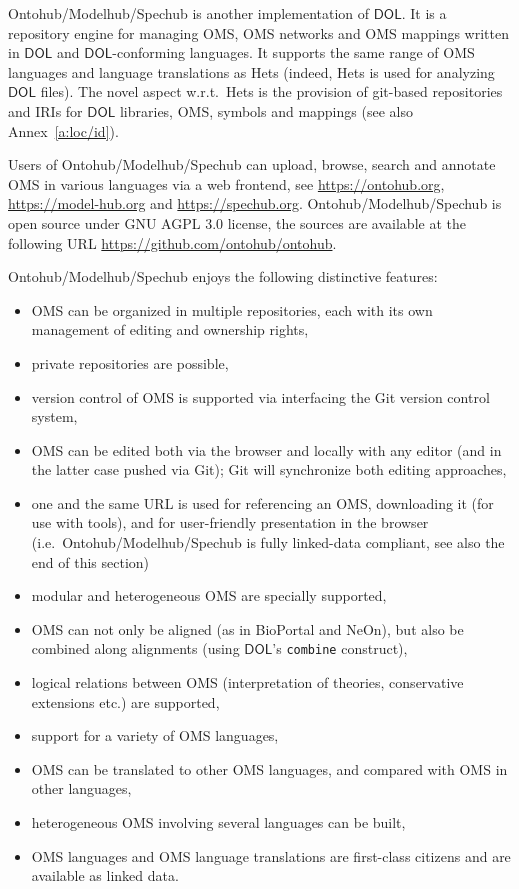 \documentclass[10pt, a4paper]{isov2}
\newcommand*{\syntax}[1]{\texttt{#1}}
\newcommand*{\DOL}{\ensuremath{\mathsf{DOL}}\xspace}
\begin{document}
\label{a:ontohub}


Ontohub/Modelhub/Spechub is  another implementation  of
\DOL. It is a repository engine for managing OMS, OMS networks and OMS
mappings written in \DOL and \DOL-conforming languages.  It supports the
same range of OMS languages and language translations as Hets (indeed,
Hets is used for analyzing \DOL files). The novel aspect w.r.t.\ Hets
is the provision of git-based repositories and IRIs for \DOL libraries,
OMS, symbols and mappings (see also Annex~\ref{a:loc/id}).

Users of Ontohub/Modelhub/Spechub can upload, browse, search and annotate 
OMS in various languages via a web frontend, 
see \url{https://ontohub.org}, \url{https://model-hub.org} and \url{https://spechub.org}.
Ontohub/Modelhub/Spechub is open source under GNU AGPL 3.0 license,  the sources are available at the following URL 
\url{https://github.com/ontohub/ontohub}.

Ontohub/Modelhub/Spechub enjoys the following distinctive features:
 \begin{itemize} 
  \item OMS can be organized in multiple repositories, each
     with its own management of editing and ownership rights,
  \item private repositories are possible,
  \item version control of OMS is supported via interfacing
   the Git version control system,
  \item OMS can be edited both via the browser and locally with any
  editor (and in the latter case pushed via Git); Git will synchronize both editing approaches,
  \item one and the same URL is used for referencing an OMS, downloading
     it (for use with tools), and for user-friendly presentation in
     the browser (i.e.\ Ontohub/Modelhub/Spechub is fully linked-data compliant,  see also the end of this section)
  \item modular and heterogeneous OMS are specially supported,
  \item OMS can not only be aligned (as in BioPortal and NeOn), but also be combined along alignments (using \DOL's \syntax{combine} construct),
  \item logical relations between OMS (interpretation of theories, conservative
  extensions etc.) are supported,
  \item support for a variety of OMS languages, 
  \item OMS can be translated to other OMS languages, and compared with
   OMS in other languages,
  \item heterogeneous OMS involving several languages can be built,
  \item OMS languages and OMS language translations are first-class
   citizens and are available as linked data.
 \end{itemize} 
\end{document}
